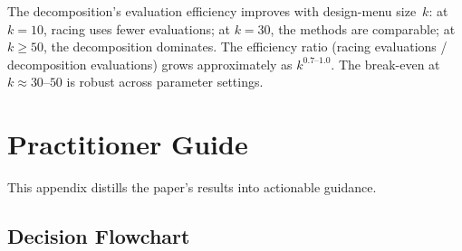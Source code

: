 \documentclass[twoside,11pt]{article}
\begin{document}
The decomposition's evaluation efficiency improves with design-menu size~$k$:
at $k = 10$, racing uses fewer evaluations;
at $k = 30$, the methods are comparable;
at $k \ge 50$, the decomposition dominates.
The efficiency ratio (racing evaluations / decomposition evaluations) grows approximately as $k^{0.7\text{--}1.0}$.
The break-even at $k \approx 30\text{--}50$ is robust across parameter settings.
\section{Practitioner Guide}
\label{app:practitioner}

This appendix distills the paper's results into actionable guidance.

\subsection{Decision Flowchart}
\end{document}
